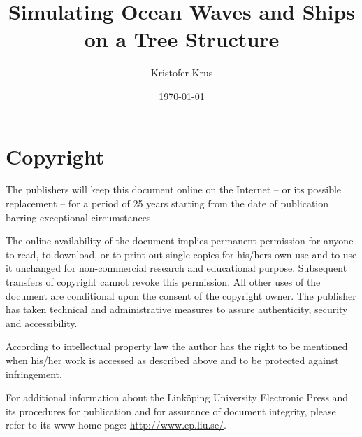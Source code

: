 \documentclass{report}
\begin{document}
\title{Simulating Ocean Waves and Ships on a Tree Structure}
\author{Kristofer Krus}
\date{\today}
\maketitle

\section*{Copyright}
The publishers will keep this document online on the Internet -- or its possible replacement -- for a period of 25 years starting from the date of publication barring exceptional circumstances.

The online availability of the document implies permanent permission for anyone to read, to download, or to print out single copies for his/hers own use and to use it unchanged for non-commercial research and educational purpose. Subsequent transfers of copyright cannot revoke this permission. All other uses of the document are conditional upon the consent of the copyright owner. The publisher has taken technical and administrative measures to assure authenticity, security and accessibility.

According to intellectual property law the author has the right to be mentioned when his/her work is accessed as described above and to be protected against infringement.

For additional information about the Linköping University Electronic Press and its procedures for publication and for assurance of document integrity, please refer to its www home page: \url{http://www.ep.liu.se/}.
\end{document}
